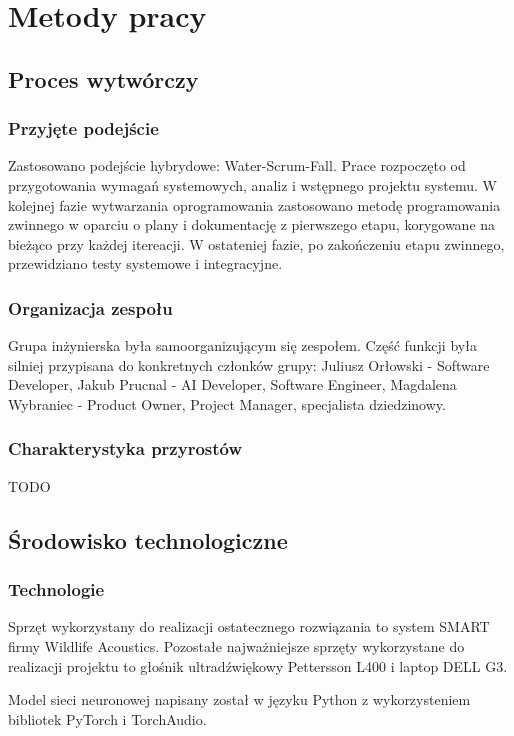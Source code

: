 \documentclass{sprz}
\begin{document}
\chapter{Metody pracy}

\section{Proces wytwórczy}

\subsection{Przyjęte podejście}
Zastosowano podejście hybrydowe: Water-Scrum-Fall. Prace rozpoczęto od przygotowania wymagań systemowych, analiz i wstępnego projektu systemu. W kolejnej fazie wytwarzania oprogramowania zastosowano metodę programowania zwinnego w oparciu o plany i dokumentację z pierwszego etapu, korygowane na bieżąco przy każdej itereacji. W ostateniej fazie, po zakończeniu etapu zwinnego, przewidziano testy systemowe i integracyjne.

\subsection{Organizacja zespołu}
Grupa inżynierska była samoorganizującym się zespołem. Część funkcji była silniej przypisana do konkretnych członków grupy:
Juliusz Orłowski - Software Developer, Jakub Prucnal - AI Developer, Software Engineer, Magdalena Wybraniec - Product Owner, Project Manager, specjalista dziedzinowy. 

\subsection{Charakterystyka przyrostów}
TODO

\section{Środowisko technologiczne}

\subsection{Technologie}
Sprzęt wykorzystany do realizacji ostatecznego rozwiązania to system SMART firmy Wildlife Acoustics. Pozostałe najważniejsze sprzęty wykorzystane do realizacji projektu to głośnik ultradźwiękowy Pettersson L400 i laptop DELL G3.

Model sieci neuronowej napisany został w języku Python z wykorzysteniem bibliotek PyTorch i TorchAudio.
\end{document}
